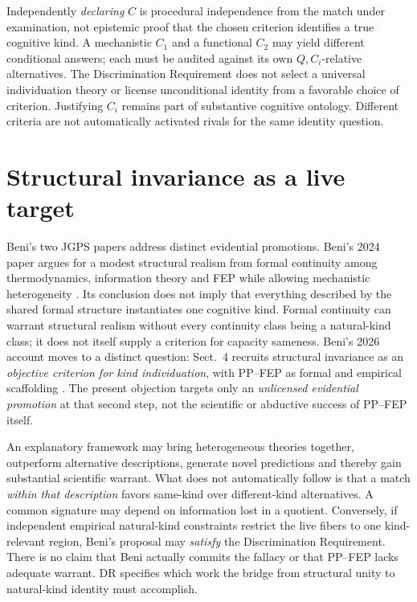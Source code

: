 \documentclass[11pt]{article}
\begin{document}
Independently \emph{declaring} \(C\) is procedural independence from the match under examination, not epistemic proof that the chosen criterion identifies a true cognitive kind. A mechanistic \(C_1\) and a functional \(C_2\) may yield different conditional answers; each must be audited against its own \(Q,C_i\)-relative alternatives. The Discrimination Requirement does not select a universal individuation theory or license unconditional identity from a favorable choice of criterion. Justifying \(C_i\) remains part of substantive cognitive ontology. Different criteria are not automatically activated rivals for the same identity question.


\section{Structural invariance as a live target}

Beni's two JGPS papers address distinct evidential promotions. Beni's 2024 paper argues for a modest structural realism from formal continuity among thermodynamics, information theory and FEP while allowing mechanistic heterogeneity \citep{Beni2024StructuralRealismFEP}. Its conclusion does not imply that everything described by the shared formal structure instantiates one cognitive kind. Formal continuity can warrant structural realism without every continuity class being a natural-kind class; it does not itself supply a criterion for capacity sameness. Beni's 2026 account moves to a distinct question: Sect.~4 recruits structural invariance as an \emph{objective criterion for kind individuation}, with PP--FEP as formal and empirical scaffolding \citep[Sec.~4]{Beni2026KindsWithoutStructure}. The present objection targets only an \emph{unlicensed evidential promotion} at that second step, not the scientific or abductive success of PP--FEP itself.

An explanatory framework may bring heterogeneous theories together, outperform alternative descriptions, generate novel predictions and thereby gain substantial scientific warrant. What does not automatically follow is that a match \emph{within that description} favors same-kind over different-kind alternatives. A common signature may depend on information lost in a quotient. Conversely, if independent empirical natural-kind constraints restrict the live fibers to one kind-relevant region, Beni's proposal may \emph{satisfy} the Discrimination Requirement. There is no claim that Beni actually commits the fallacy or that PP--FEP lacks adequate warrant. DR specifies which work the bridge from structural unity to natural-kind identity must accomplish.
\end{document}
